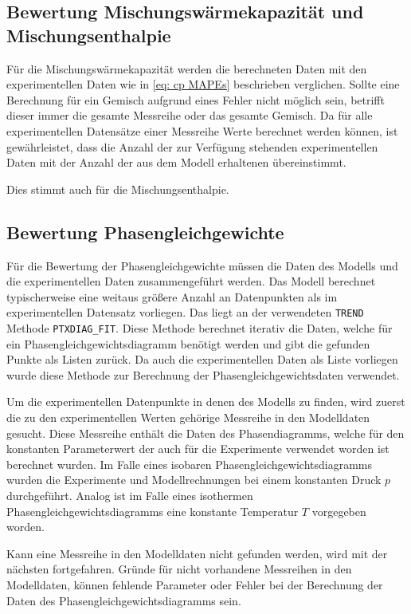 \documentclass[../thesis.tex]{subfiles}
\begin{document}
\subsection{Bewertung Mischungswärmekapazität und Mischungsenthalpie}

Für die Mischungswärmekapazität werden die berechneten Daten mit den experimentellen Daten wie in \autoref{eq: cp MAPEs} beschrieben verglichen. Sollte eine Berechnung für ein Gemisch aufgrund eines Fehler nicht möglich sein, betrifft dieser immer die gesamte Messreihe oder das gesamte Gemisch. Da für alle experimentellen Datensätze einer Messreihe Werte berechnet werden können, ist gewährleistet, dass die Anzahl der zur Verfügung stehenden experimentellen Daten mit der Anzahl der aus dem Modell erhaltenen übereinstimmt.

Dies stimmt auch für die Mischungsenthalpie.

\subsection{Bewertung Phasengleichgewichte}

Für die Bewertung der Phasengleichgewichte müssen die Daten des Modells und die experimentellen Daten zusammengeführt werden. Das Modell berechnet typischerweise eine weitaus größere Anzahl an Datenpunkten als im experimentellen Datensatz vorliegen. Das liegt an der verwendeten \texttt{TREND} Methode \texttt{PTXDIAG\_FIT}. Diese Methode berechnet iterativ die Daten, welche für ein Phasengleichgewichtsdiagramm benötigt werden und gibt die gefunden Punkte als Listen zurück. Da auch die experimentellen Daten als Liste vorliegen wurde diese Methode zur Berechnung der Phasengleichgewichtsdaten verwendet.

Um die experimentellen Datenpunkte in denen des Modells zu finden, wird zuerst die zu den experimentellen Werten gehörige Messreihe in den Modelldaten gesucht. Diese Messreihe enthält die Daten des Phasendiagramms, welche für den konstanten Parameterwert der auch für die Experimente verwendet worden ist berechnet wurden.  Im Falle eines isobaren Phasengleichgewichtsdiagramms wurden die Experimente und Modellrechnungen bei einem konstanten Druck $ p $ durchgeführt. Analog ist im Falle eines isothermen Phasengleichgewichtsdiagramms eine konstante Temperatur $ T $ vorgegeben worden.

Kann eine Messreihe in den Modelldaten nicht gefunden werden, wird mit der nächsten fortgefahren. Gründe für nicht vorhandene Messreihen in den Modelldaten, können fehlende Parameter oder Fehler bei der Berechnung der Daten des Phasengleichgewichtsdiagramms sein.
\\
\end{document}
